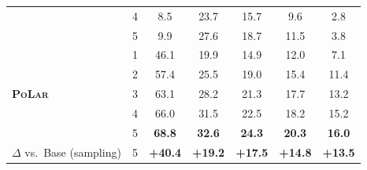 \documentclass{article}
\theoremstyle{plain}
\theoremstyle{definition}
\theoremstyle{remark}
\newcommand\ours{\textsc{PoLar}\xspace}
\begin{document}
\begin{table}[t]
{\begin{tabular}{llccccc}
& 4 & 8.5 & 23.7 & 15.7 & 9.6 & 2.8 \\
& 5 & 9.9 & 27.6 & 18.7 & 11.5 & 3.8 \\
\midrule
\multirow{5}{*}{\textbf{\ours}}
& 1 & 46.1 & 19.9 & 14.9 & 12.0 & 7.1 \\
& 2 & 57.4 & 25.5 & 19.0 & 15.4 & 11.4 \\
& 3 & 63.1 & 28.2 & 21.3 & 17.7 & 13.2 \\
& 4 & 66.0 & 31.5 & 22.5 & 18.2 & 15.2 \\
\rowcolor{blue!10}
& 5 & \textbf{68.8} & \textbf{32.6} & \textbf{24.3} & \textbf{20.3} & \textbf{16.0} \\
\midrule
$\Delta$ vs.\ Base (sampling) & 5 & \textbf{+40.4} & \textbf{+19.2} & \textbf{+17.5} & \textbf{+14.8} & \textbf{+13.5} \\
\bottomrule
\end{tabular}}
\end{table}
\end{document}
